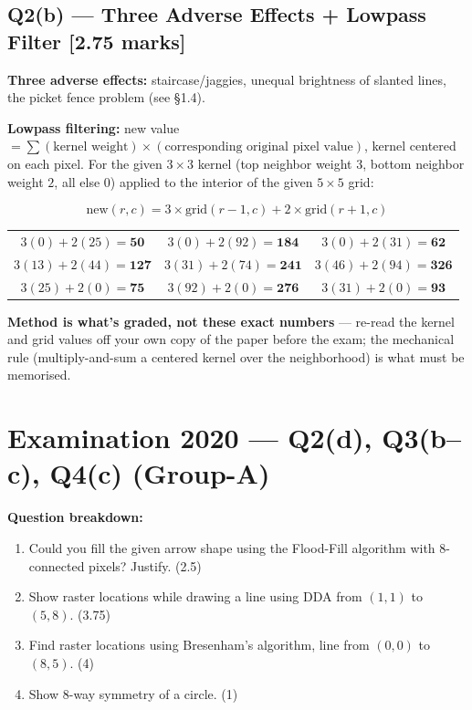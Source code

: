 \documentclass[12pt, a4paper]{article}
\newenvironment{solutionbox}{\begin{mdframed}[style=solutionframe]}{\end{mdframed}}
\newenvironment{answerbox}{\begin{mdframed}[style=answerframe]}{\end{mdframed}}
\newenvironment{notesbox}{\begin{mdframed}[style=notesframe]}{\end{mdframed}}
\begin{document}
\subsection*{Q2(b) --- Three Adverse Effects + Lowpass Filter [2.75 marks]}
\begin{answerbox}
\textbf{Three adverse effects:} staircase/jaggies, unequal brightness of slanted lines, the picket fence problem (see \S1.4).
\end{answerbox}
\textbf{Lowpass filtering:} new value $=\sum(\text{kernel weight})\times(\text{corresponding original pixel value})$, kernel centered on each pixel. For the given $3\times3$ kernel (top neighbor weight $3$, bottom neighbor weight $2$, all else $0$) applied to the interior of the given $5\times5$ grid:
\begin{solutionbox}
$$\text{new}(r,c) = 3\times\text{grid}(r{-}1,c) + 2\times\text{grid}(r{+}1,c)$$
\begin{center}
\begin{tabular}{ccc}
$3(0)+2(25)=\mathbf{50}$ & $3(0)+2(92)=\mathbf{184}$ & $3(0)+2(31)=\mathbf{62}$ \\
$3(13)+2(44)=\mathbf{127}$ & $3(31)+2(74)=\mathbf{241}$ & $3(46)+2(94)=\mathbf{326}$ \\
$3(25)+2(0)=\mathbf{75}$ & $3(92)+2(0)=\mathbf{276}$ & $3(31)+2(0)=\mathbf{93}$ \\
\end{tabular}
\end{center}
\end{solutionbox}
\begin{notesbox}
\textbf{Method is what's graded, not these exact numbers} --- re-read the kernel and grid values off your own copy of the paper before the exam; the mechanical rule (multiply-and-sum a centered kernel over the neighborhood) is what must be memorised.
\end{notesbox}

\section{Examination 2020 --- Q2(d), Q3(b--c), Q4(c) (Group-A)}
\begin{solutionbox}
\textbf{Question breakdown:}
\begin{enumerate}[noitemsep]
  \item[Q2(d)] Could you fill the given arrow shape using the Flood-Fill algorithm with 8-connected pixels? Justify. (2.5)
  \item[Q3(b)] Show raster locations while drawing a line using DDA from $(1,1)$ to $(5,8)$. (3.75)
  \item[Q3(c)] Find raster locations using Bresenham's algorithm, line from $(0,0)$ to $(8,5)$. (4)
  \item[Q4(c)] Show 8-way symmetry of a circle. (1)
\end{enumerate}
\end{solutionbox}
\end{document}
